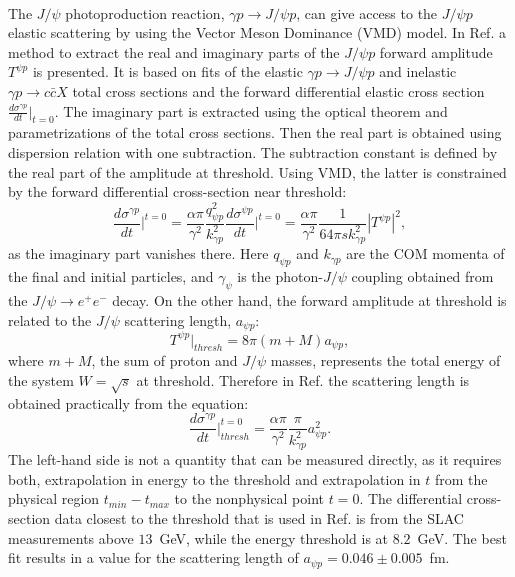 \documentclass[%
preprint,
nofootinbib,
 amsmath,amssymb,
 aps,
floatfix,
]{revtex4-1}
\begin{document}

\clearpage
\mbox{~}

The $J/\psi $ photoproduction reaction, $\gamma p \to J/\psi p$, can give access to the 
$J/\psi p$ elastic scattering by using the Vector Meson Dominance (VMD) model.
In Ref. \cite{Vanderhaeghen_jpsi} a method to extract the real and imaginary parts of
the $J/\psi p$ forward amplitude $T^{\psi p}$ is presented.
It is based on fits of the elastic $\gamma p \to J/\psi p$ and inelastic
$\gamma p \to c\bar{c} X$ total cross sections 
and the forward differential elastic cross section $\frac{d\sigma^{\gamma p}}{dt}\vert _{t=0}$.
The imaginary part is extracted using the optical theorem and 
parametrizations of the total cross sections.  
Then the real part is obtained using dispersion relation with one subtraction.
The subtraction constant is defined by the real part of the amplitude at threshold.
Using VMD, the latter is constrained by the forward differential cross-section near threshold:
\begin{equation}
\frac{d\sigma^{\gamma p}}{dt}\Big| ^{t=0} = 
\frac{\alpha \pi}{\gamma ^2}\frac{q_{\psi p}^2}{k_{\gamma p}^2}
\frac{d\sigma^{\psi p}}{dt}\Big| ^{t=0} =
\frac{\alpha \pi}{\gamma ^2}\frac{1}{64\pi s k_{\gamma p}^2}|T^{\psi p}|^2,
\end{equation}
as the imaginary part vanishes there. 
Here $q_{\psi p}$ and $k_{\gamma p}$ are the COM momenta
of the final and initial particles, and $\gamma _\psi$ is the photon-$J/\psi $ coupling
obtained from the $J/\psi \to e^+e^-$ decay.  
On the other hand, the forward amplitude at threshold 
is related to the $J/\psi $ scattering length, $a_{\psi p}$:
\begin{equation} 
T^{\psi p}\vert_{thresh} = 8\pi(m+M)a_{\psi p},
\end{equation} 
where $m+M$, the sum of proton and $J/\psi $ masses, represents the total energy of the system 
$W=\sqrt{s}$ at threshold.
Therefore in Ref. \cite{Vanderhaeghen_jpsi} the scattering length is obtained
practically from the equation:
\begin{equation}
\frac{d\sigma^{\gamma p}}{dt}\Big| ^{t=0}_{thresh} = 
\frac{\alpha \pi}{\gamma ^2}\frac{\pi }{k_{\gamma p}^2}a_{\psi p}^2.
\label{eq:method1}
\end{equation}
The left-hand side is not a quantity that can be  measured directly, as it requires 
both, extrapolation in energy to the threshold and extrapolation in $t$
from the physical region $t_{min}-t_{max}$ to the nonphysical point $t=0$.
The differential cross-section data closest to the threshold 
that is used in Ref. \cite{Vanderhaeghen_jpsi} is from the SLAC \cite{SLAC}
measurements above $13$~GeV, while the energy threshold is at $8.2$~GeV.
The best fit results in a value for the scattering  
length of $a_{\psi p} = 0.046 \pm 0.005$~fm.
\end{document}
